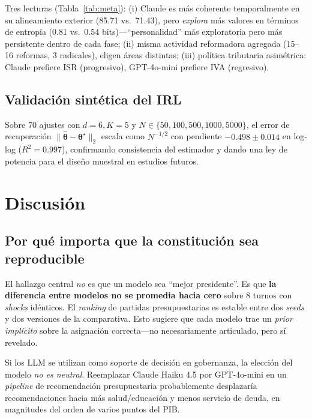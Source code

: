 \documentclass[conference]{IEEEtran}
\begin{document}
Tres lecturas (Tabla~\ref{tab:meta}): (i) Claude es m\'as coherente
temporalmente en su alineamiento exterior (85.71 vs.\ 71.43), pero
\emph{explora} m\'as valores en t\'erminos de entrop\'ia (0.81 vs.\
0.54 bits)---``personalidad'' m\'as exploratoria pero m\'as persistente
dentro de cada fase; (ii) misma actividad reformadora agregada
(15--16 reformas, 3 radicales), eligen \'areas distintas; (iii)
pol\'itica tributaria asim\'etrica: Claude prefiere ISR (progresivo),
GPT-4o-mini prefiere IVA (regresivo).

\subsection{Validaci\'on sint\'etica del IRL}

Sobre 70 ajustes con $d{=}6,K{=}5$ y $N\in\{50,100,500,1000,5000\}$,
el error de recuperaci\'on
$\|\hat{\boldsymbol{\theta}}-\boldsymbol{\theta}^\star\|_2$ escala
como $N^{-1/2}$ con pendiente $-0.498\pm 0.014$ en log-log
($R^2{=}0.997$), confirmando consistencia del estimador y dando una
ley de potencia para el dise\~no muestral en estudios futuros.

\section{Discusi\'on}

\subsection{Por qu\'e importa que la constituci\'on sea reproducible}

El hallazgo central \emph{no} es que un modelo sea ``mejor
presidente''. Es que \textbf{la diferencia entre modelos no se
promedia hacia cero} sobre 8 turnos con \emph{shocks} id\'enticos. El
\emph{ranking} de partidas presupuestarias es estable entre dos
\emph{seeds} y dos versiones de la comparativa. Esto sugiere que cada
modelo trae un \emph{prior impl\'icito} sobre la asignaci\'on
correcta---no necesariamente articulado, pero s\'i revelado.

Si los LLM se utilizan como soporte de decisi\'on en gobernanza, la
elecci\'on del modelo \emph{no es neutral}. Reemplazar Claude Haiku
4.5 por GPT-4o-mini en un \emph{pipeline} de recomendaci\'on
presupuestaria probablemente desplazar\'ia recomendaciones hacia m\'as
salud/educaci\'on y menos servicio de deuda, en magnitudes del orden
de varios puntos del PIB.
\end{document}
